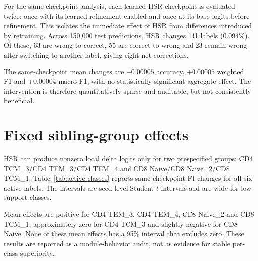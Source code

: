 \documentclass[10pt]{article}
\begin{document}
For the same-checkpoint analysis, each learned-HSR checkpoint is evaluated twice: once with its learned refinement enabled and once at its base logits before refinement. This isolates the immediate effect of HSR from differences introduced by retraining. Across 150,000 test predictions, HSR changes 141 labels (0.094\%). Of these, 63 are wrong-to-correct, 55 are correct-to-wrong and 23 remain wrong after switching to another label, giving eight net corrections.

\begin{table}[H]
\centering
\caption{Per-seed same-checkpoint HSR transitions. ``Changed'' counts refined labels that differ from base predictions. Net is wrong-to-correct minus correct-to-wrong.}
\label{tab:same-checkpoint}
\scriptsize
\setlength{\tabcolsep}{3.4pt}

\end{table}

The same-checkpoint mean changes are $+0.00005$ accuracy, $+0.00005$ weighted F1 and $+0.00004$ macro F1, with no statistically significant aggregate effect. The intervention is therefore quantitatively sparse and auditable, but not consistently beneficial.

\section{Fixed sibling-group effects}

HSR can produce nonzero local delta logits only for two prespecified groups: CD4 TCM\_3/CD4 TEM\_3/CD4 TEM\_4 and CD8 Naive/CD8 Naive\_2/CD8 TCM\_1. Table~\ref{tab:active-classes} reports same-checkpoint F1 changes for all six active labels. The intervals are seed-level Student-$t$ intervals and are wide for low-support classes.

\begin{table}[H]
\centering
\caption{Same-checkpoint per-class HSR effects for the six fixed sibling labels. Positive and negative counts exclude exact zero changes.}
\label{tab:active-classes}
\small

\end{table}

Mean effects are positive for CD4 TEM\_3, CD4 TEM\_4, CD8 Naive\_2 and CD8 TCM\_1, approximately zero for CD4 TCM\_3 and slightly negative for CD8 Naive. None of these mean effects has a 95\% interval that excludes zero. These results are reported as a module-behavior audit, not as evidence for stable per-class superiority.
\end{document}
